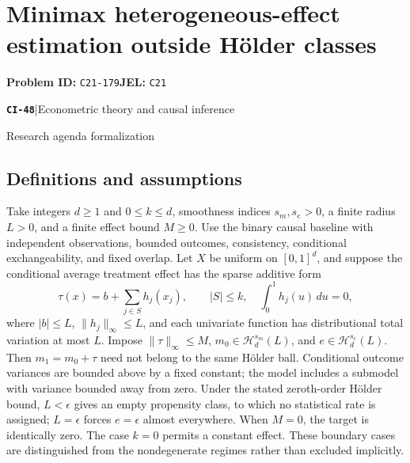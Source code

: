 \documentclass[11pt,a4paper]{article}
\newcommand{\entrymeta}[3]{{\sffamily\small\color{muted}\textbf{\texttt{#1}}\quad|\quad #2\par #3\par}}
\begin{document}
\section*{Minimax heterogeneous-effect estimation outside Hölder classes}
\textbf{Problem ID:} \texttt{C21-179}\quad \textbf{JEL:} \texttt{C21}\par
\label{problem:OP-0527}
\label{beyond:CI-48}
\entrymeta{CI-48}{Econometric theory and causal inference}{Research agenda formalization}
\subsection*{Definitions and assumptions}
Take integers $d\geq1$ and $0\leq k\leq d$, smoothness indices $s_m,s_e>0$, a finite radius $L>0$, and a finite effect bound $M\geq0$. Use the binary causal baseline with independent observations, bounded outcomes, consistency, conditional exchangeability, and fixed overlap. Let $X$ be uniform on $[0,1]^d$, and suppose the conditional average treatment effect has the sparse additive form
\[
 \tau(x)=b+\sum_{j\in S}h_j(x_j),\qquad
 |S|\leq k,\quad
 \int_0^1h_j(u)\,du=0,
\]
where $|b|\leq L$, $\|h_j\|_\infty\leq L$, and each univariate function has distributional total variation at most $L$. Impose $\|\tau\|_\infty\leq M$, $m_0\in\mathcal H_d^{s_m}(L)$, and $e\in\mathcal H_d^{s_e}(L)$. Then $m_1=m_0+\tau$ need not belong to the same Hölder ball. Conditional outcome variances are bounded above by a fixed constant; the model includes a submodel with variance bounded away from zero.
Under the stated zeroth-order Hölder bound, $L<\epsilon$ gives an empty propensity class, to which no statistical rate is assigned; $L=\epsilon$ forces $e=\epsilon$ almost everywhere. When $M=0$, the target is identically zero. The case $k=0$ permits a constant effect. These boundary cases are distinguished from the nondegenerate regimes rather than excluded implicitly.
\end{document}
